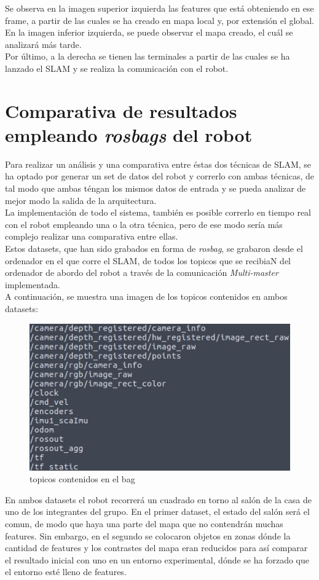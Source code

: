 Se observa en la imagen superior izquierda las features que está obteniendo en ese frame, a partir de las cuales se ha creado en mapa local y,
por extensión el global. En la imagen inferior izquierda, se puede observar el mapa creado, el cuál se analizará más tarde.\\
Por último, a la derecha se tienen las terminales a partir de las cuales se ha lanzado el SLAM y se realiza la comunicación con el robot.\\

\newpage

\section{Comparativa de resultados empleando \textit{rosbags} del robot}
Para realizar un análisis y una comparativa entre éstas dos técnicas de SLAM, se ha optado por generar un set de datos del robot y correrlo con ambas técnicas,
de tal modo que ambas téngan los mismos datos de entrada y se pueda analizar de mejor modo la salida de la arquitectura. \\
La implementación de todo el sistema, también es posible correrlo en tiempo real con el robot empleando una o la otra técnica, pero de ese modo sería más complejo
realizar una comparativa entre ellas. \\
Estos datasets, que han sido grabados en forma de \textit{rosbag}, se grabaron desde el ordenador en el que corre el SLAM, de todos los topicos que se recibiaN
del ordenador de abordo del robot a través de la comunicación \textit{Multi-master} implementada.\\
A continuación, se muestra una imagen de los topicos contenidos en ambos datasets:
\begin{figure}[h!]
    \centering
    \includegraphics[width=.5\textwidth]{images/topics_bags}
    \caption{topicos contenidos en el bag}
\end{figure}

En ambos datasets el robot recorrerá un cuadrado en torno al salón de la casa de uno de los integrantes del grupo. En el primer dataset, el estado del salón será 
el comun, de modo que haya una parte del mapa que no contendrán muchas features. Sin embargo, en el segundo se colocaron objetos en zonas dónde la cantidad de features
y los contrastes del mapa eran reducidos para así comparar el resultado inicial con uno en un entorno experimental, dónde se ha forzado que el entorno esté lleno de features.\\

